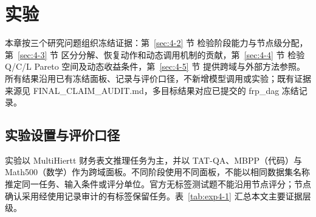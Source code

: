 \section{实验}\label{sec:exp}

本章按三个研究问题组织冻结证据：第~\ref{sec:4-2} 节 检验阶段能力与节点级分配，第~\ref{sec:4-3} 节 区分分解、恢复动作和动态调用机制的贡献，第~\ref{sec:4-4} 节 检验 Q/C/L Pareto 空间及动态收益条件，第~\ref{sec:4-5} 节 提供跨域与外部方法参照。所有结果沿用已有冻结面板、记录与评价口径，不新增模型调用或实验；既有证据来源见 FINAL\_CLAIM\_AUDIT.md，多目标结果对应已提交的 frp\_dag 冻结记录。

\FloatBarrier
\subsection{实验设置与评价口径}\label{sec:4-1}

实验以 MultiHiertt 财务表文推理任务为主\cite{zhao2022multihiertt}，并以 TAT-QA\cite{zhu2021tatqa}、MBPP\cite{austin2021mbpp}（代码）与 Math500\cite{hendrycks2021math,lightman2024verify}（数学）作为跨域面板。不同阶段使用不同面板，不能以相同数据集名称推定同一任务、输入条件或评分单位。官方无标签测试题不能沿用节点评分；节点确认采用经使用记录审计的有标签保留任务。表~\ref{tab:exp4-1} 汇总本文主要证据层级。

